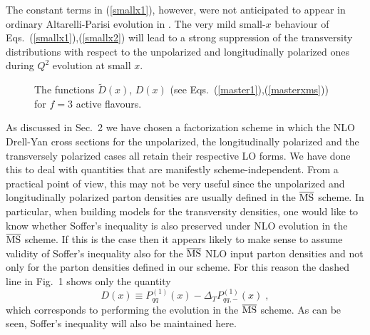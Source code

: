 The constant terms in (\ref{smallx1}), however, were not anticipated to appear 
in ordinary Altarelli-Parisi evolution in \cite{kmss}.
The very mild small-$x$ behaviour of Eqs.~(\ref{smallx1}),(\ref{smallx2}) will 
lead to a strong suppression of the transversity distributions with respect 
to the unpolarized and longitudinally polarized ones during $Q^2$ evolution 
at small $x$.
\begin{figure}[htb]
\caption{The functions $\tilde{D}(x)$, $D (x)$ 
(see Eqs.~(\ref{master1}),(\ref{masterxms})) for $f=3$ active flavours.}
\end{figure}

As discussed in Sec.~2 we have chosen a factorization scheme in which 
the NLO Drell-Yan cross sections for the unpolarized, the longitudinally
polarized and the transversely polarized cases all retain their respective
LO forms. We have done this to deal with quantities that are manifestly
scheme-independent. From a practical point of view, this may not be 
very useful since the unpolarized and longitudinally polarized parton
densities are usually defined in the $\overline{{\mbox{\rm MS}}}$ scheme.
In particular, when building models for the transversity densities, one
would like to know whether Soffer's inequality is also preserved under
NLO evolution in the $\overline{{\mbox{\rm MS}}}$ scheme. If this is 
the case then it appears likely to make sense to assume validity of Soffer's 
inequality also for the $\overline{{\mbox{\rm MS}}}$ NLO input parton 
densities and not only for the parton densities defined in our scheme. 
For this reason the dashed line in Fig.~1 shows only the quantity
\begin{equation} \label{masterxms}
D (x) \equiv P_{qq}^{(1)} (x)-\Delta_T P_{qq,-}^{(1)} (x) \; ,
\end{equation} 
which corresponds to performing the evolution in the $\overline{{\mbox{\rm 
MS}}}$ scheme. As can be seen, Soffer's inequality will also be maintained 
here. 

